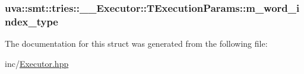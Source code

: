 \subsubsection[{m\+\_\+word\+\_\+index\+\_\+type}]{ uva\+::smt\+::tries\+::\+\_\+\+\_\+\+Executor\+::\+T\+Execution\+Params\+::m\+\_\+word\+\_\+index\+\_\+type}\label{structuva_1_1smt_1_1tries_1_1_____executor_1_1_t_execution_params_a05ef7c9283a7c09bb50ee89a7a4fc478}


The documentation for this struct was generated from the following file\+:\begin{DoxyCompactItemize}
\item 
inc/\hyperlink{_executor_8hpp}{Executor.\+hpp}\end{DoxyCompactItemize}
